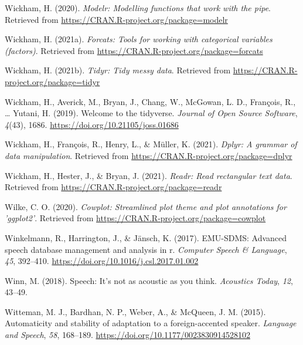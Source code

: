 \documentclass[
  11pt,
  man,floatsintext]{apa6}
\newlength{\cslhangindent}
\newlength{\cslentryspacingunit} %
\newenvironment{CSLReferences}[2] %
 {%
  \setlength{\parindent}{0pt}
  \ifodd #1
  \let\oldpar\par
  \def\par{\hangindent=\cslhangindent\oldpar}
  \fi
  \setlength{\parskip}{#2\cslentryspacingunit}
 }%
 {}
\begin{document}
\begin{CSLReferences}{1}{0}
\leavevmode{}%
Wickham, H. (2020). \emph{Modelr: Modelling functions that work with the pipe}. Retrieved from \url{https://CRAN.R-project.org/package=modelr}

\leavevmode{}%
Wickham, H. (2021a). \emph{Forcats: Tools for working with categorical variables (factors)}. Retrieved from \url{https://CRAN.R-project.org/package=forcats}

\leavevmode{}%
Wickham, H. (2021b). \emph{Tidyr: Tidy messy data}. Retrieved from \url{https://CRAN.R-project.org/package=tidyr}

\leavevmode{}%
Wickham, H., Averick, M., Bryan, J., Chang, W., McGowan, L. D., François, R., \ldots{} Yutani, H. (2019). Welcome to the {tidyverse}. \emph{Journal of Open Source Software}, \emph{4}(43), 1686. \url{https://doi.org/10.21105/joss.01686}

\leavevmode{}%
Wickham, H., François, R., Henry, L., \& Müller, K. (2021). \emph{Dplyr: A grammar of data manipulation}. Retrieved from \url{https://CRAN.R-project.org/package=dplyr}

\leavevmode{}%
Wickham, H., Hester, J., \& Bryan, J. (2021). \emph{Readr: Read rectangular text data}. Retrieved from \url{https://CRAN.R-project.org/package=readr}

\leavevmode{}%
Wilke, C. O. (2020). \emph{Cowplot: Streamlined plot theme and plot annotations for 'ggplot2'}. Retrieved from \url{https://CRAN.R-project.org/package=cowplot}

\leavevmode{}%
Winkelmann, R., Harrington, J., \& Jänsch, K. (2017). EMU-SDMS: Advanced speech database management and analysis in r. \emph{Computer Speech \& Language}, \emph{45}, 392--410. \url{https://doi.org/10.1016/j.csl.2017.01.002}

\leavevmode{}%
Winn, M. (2018). Speech: It's not as acoustic as you think. \emph{Acoustics Today}, \emph{12}, 43--49.

\leavevmode{}%
Witteman, M. J., Bardhan, N. P., Weber, A., \& McQueen, J. M. (2015). Automaticity and stability of adaptation to a foreign-accented speaker. \emph{Language and Speech}, \emph{58}, 168--189. \url{https://doi.org/10.1177/0023830914528102}


\end{CSLReferences}
\end{document}

